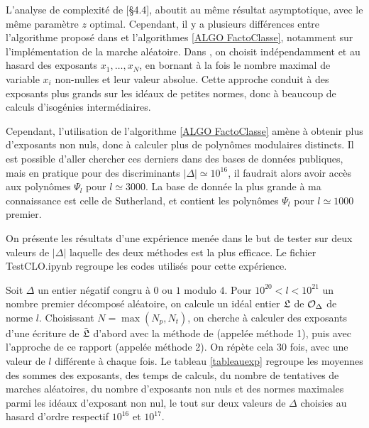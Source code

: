 L'analyse de complexité de \cite{JaoSoukharev}[\S 4.4], aboutit au même résultat asymptotique, avec le même paramètre $z$ optimal. Cependant, il y a plusieurs différences entre l'algorithme proposé dans \cite{JaoSoukharev} et l'algorithmes \ref{ALGO FactoClasse}, notamment sur l'implémentation de la marche aléatoire. Dans \cite{JaoSoukharev}, on choisit indépendamment et au hasard des exposants $x_1,\ldots,x_N$, en bornant à la fois le nombre maximal de variable $x_i$ non-nulles et leur valeur absolue. Cette approche conduit à des exposants plus grands sur les idéaux de petites normes, donc à beaucoup de calculs d'isogénies intermédiaires. 

Cependant, l'utilisation de l'algorithme \ref{ALGO FactoClasse} amène à obtenir plus d'exposants non nuls, donc à calculer plus de polynômes modulaires distincts. Il est possible d'aller chercher ces derniers dans des bases de données publiques, mais en pratique pour des discriminants $|\Delta|\simeq 10^{16}$, il faudrait alors avoir accès aux polynômes $\Psi_{l}$ pour $l\simeq 3000$. La base de donnée la plus grande à ma connaissance est celle de Sutherland, et contient les polynômes $\Psi_{l}$ pour $l\simeq 1000$ premier. 

On présente les résultats d'une expérience menée dans le but de tester sur deux valeurs de $|\Delta|$ laquelle des deux méthodes est la plus efficace. Le fichier TestCLO.ipynb \cite{GITHUBRapportStage} regroupe les codes utilisés pour cette expérience.

Soit $\Delta$ un entier négatif congru à $0$ ou $1$ modulo $4$. Pour $10^{20} < l < 10^{21}$ un nombre premier décomposé aléatoire, on calcule un idéal entier $\mathfrak{L}$ de $\mathcal{O}_{\Delta}$ de norme $l$. Choisissant $N = \max(N_p, N_t)$, on cherche à calculer des exposants d'une écriture de $\tilde{\mathfrak{L}}$ d'abord avec la méthode de \cite{JaoSoukharev} (appelée méthode 1), puis avec l'approche de ce rapport (appelée méthode 2). On répète cela $30$ fois, avec une valeur de $l$ différente à chaque fois. Le tableau \ref{tableauexp} regroupe les moyennes des sommes des exposants, des temps de calculs, du nombre de tentatives de marches aléatoires, du nombre d'exposants non nuls et des normes maximales parmi les idéaux d'exposant non nul, le tout sur deux valeurs de $\Delta$ choisies au hasard d'ordre respectif $10^{16}$ et $10^{17}$.\\


